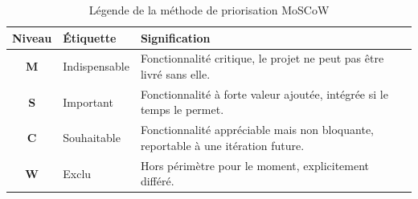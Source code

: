 \begin{table}[H]
\centering
\begin{tabular}{|c|l|p{9cm}|}
\hline
\rowcolor[HTML]{EFEFEF} \textbf{Niveau} & \textbf{Étiquette} & \textbf{Signification} \\ \hline
\textbf{M} & Indispensable & Fonctionnalité critique, le projet ne peut pas être livré sans elle. \\ \hline
\textbf{S} & Important     & Fonctionnalité à forte valeur ajoutée, intégrée si le temps le permet. \\ \hline
\textbf{C} & Souhaitable   & Fonctionnalité appréciable mais non bloquante, reportable à une itération future. \\ \hline
\textbf{W} & Exclu         & Hors périmètre pour le moment, explicitement différé. \\ \hline
\end{tabular}
\caption{Légende de la méthode de priorisation MoSCoW}
\label{tab:moscow}
\end{table}

